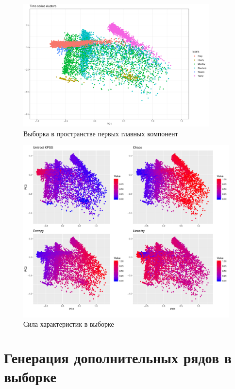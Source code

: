 \documentclass[a4paper,12pt]{article}
\begin{document}
\begin{figure}[!h] 
	\begin{center}
		\includegraphics[width=0.9\textwidth]{pca}%
		\caption{Выборка в пространстве первых главных компонент}
		\label{pca}
	\end{center}

\end{figure} 
	
	\begin{figure}[!h]
	\begin{center}
		\includegraphics[width=0.8
		\textwidth]{fin_str}%
		\caption{Сила характеристик в выборке}
		\label{fin_str}
	\end{center}
\end{figure} 

\newpage
\section{Генерация дополнительных рядов в выборке}
\end{document}
